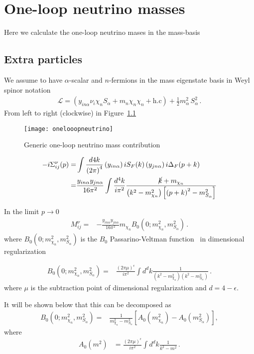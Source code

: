 \chapter{One-loop neutrino masses}
Here we calculate the one-loop neutrino mases in the mass-basis

\section{Extra particles}
We assume to have $\alpha$-scalar  and $n$-fermions in the mass eigenstate basis in Weyl spinor notation
\begin{align}
  \mathcal{L}=\left(y_{in\alpha}\nu_{i}\chi_n S_{\alpha}+m_n \chi_n\chi_n +\text{h.c} \right)+\tfrac{1}{2}m_{\alpha}^2\,S_{\alpha}^2\,.
\end{align}
From left to right (clockwise) in Figure~\ref{fig:1lnu}
\begin{figure}
  \centering
  \texttt{[image: onelooopneutrino]}
  \caption{Generic one-loop neutrino mass contribution}
  \label{fig:1lnu}
\end{figure}
\begin{align}
-i\Sigma^{\nu}_{ij}(p)=&\int \frac{d4k}{\left( 2\pi \right)^{4}}\left(y_{in\alpha}  \right)iS_F(k) \left(y_{jn\alpha}\right)i\Delta_F(p+k) \nonumber\\
=&\frac{y_{i n\alpha}y_{j n\alpha}}{16\pi^2}\int \frac{d^4k}{i\pi^2}\frac{\cancel{k}+m_{\chi_n}}{\left(k^2-m_{\chi_n}^2  \right)\left[\left(p+k\right)^2-m_{S_\alpha}^2\right]}
\end{align}

In the limit $p\to 0$
\begin{align}
\label{eq:mnub0}
   M^{\nu}_{ij}=&-\frac{y_{i n\alpha}y_{j n\alpha}}{16\pi^2}m_{\chi_n} B_0 \left( 0;m_{\chi_n}^2,m_{S_{\alpha}}^2 \right) \,.
\end{align}
where $B_0\left
(0;m_{\chi_n}^2,m^2_{S_{\alpha}} \right)$ is the $B_0$ Passarino-Veltman function~\cite{Passarino:1978jh} in dimensional regularization 

\begin{align}
  \label{eq:mnueigi02}
  B_0 \left(0;m_{\chi_n}^2,m^2_{S_{\alpha}} \right)=&\frac{\left( 2\pi \mu \right)^{\epsilon}}{i\pi^2}\int d^dk\frac{1}{\left(k^2-m_{\chi_n}^2\right)\left(k^2-m_{S_\alpha}^2\right)}\,.
\end{align}
where $\mu$ is the subtraction point of dimensional regularization and $d=4-\epsilon$.

It will be shown below that this can be decomposed as
\begin{align}
  \label{eq:mnueig}
  B_0 \left(0;m_{\chi_n}^2,m^2_{S_{\alpha}} \right)
            =&\frac{1}{m_{\chi_n}^2-m_{S_\alpha}^2}\left[ A_0\left(m_{\chi_n}^2\right)-A_0\left(m_{S_\alpha}^2\right)  \right],
\end{align}
where
\begin{align}
   A_{0}\left(m^{2}\right) &=\frac{(2 \pi \mu)^{\epsilon}}{i \pi^{2}} \int d^{d} k \frac{1}{k^{2}-m^{2}}\,.
\end{align}


